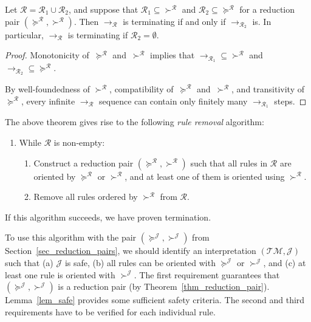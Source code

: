\documentclass[a4paper,UKenglish,cleveref,autoref,numberwithinsect]{lipics-v2019}
\theoremstyle{definition}
\newcommand{\Rules}{\mathcal{R}}
\newcommand{\arr}[1]{\longrightarrow_{#1}}
\newcommand{\Typemap}{\mathcal{T\!M}}
\newcommand{\Termmap}{\mathcal{J}}
\newcommand{\succinterpret}{\succ^{\Termmap}}
\newcommand{\succeqinterpret}{\succeq^{\Termmap}}
\begin{document}
\begin{theorem}\label{thm:ruleremove}
  Let $\Rules = \Rules_1 \cup \Rules_2$, and suppose that
  $\Rules_1\subseteq{\succ^\Rules}$ and
  $\Rules_2\subseteq{\succeq^\Rules}$ for a reduction pair
  $(\succeq^\Rules,\succ^\Rules)$. Then $\arr{\Rules}$ is terminating
  if and only if $\arr{\Rules_2}$ is. In particular, $\arr{\Rules}$ is
  terminating if $\Rules_2 = \emptyset$.
\end{theorem}

\begin{proof}
  Monotonicity of~$\succeq^\Rules$ and~$\succ^\Rules$ implies that
  ${\arr{\Rules_1}}\subseteq{\succ^\Rules}$ and
  ${\arr{\Rules_2}}\subseteq{\succeq^\Rules}$.

  By well-foundedness of $\succ^\Rules$, compatibility
  of~$\succeq^\Rules$ and~$\succ^\Rules$, and transitivity
  of~$\succeq^\Rules$, every infinite $\arr{\Rules}$ sequence can
  contain only finitely many $\arr{\Rules_1}$ steps.
\end{proof}

The above theorem gives rise to the following \emph{rule removal}
algorithm:
\begin{enumerate}
\item While $\Rules$ is non-empty:
  \begin{enumerate}
  \item Construct a reduction pair $(\succeq^\Rules,\succ^\Rules)$
    such that all rules in $\Rules$ are oriented by $\succeq^\Rules$ or
    $\succ^\Rules$, and at least one of them is oriented using
    $\succ^\Rules$.
  \item Remove all rules ordered by $\succ^\Rules$ from $\Rules$.
  \end{enumerate}
\end{enumerate}
If this algorithm succeeds, we have proven termination.

\medskip
To use this algorithm with the pair $(\succeqinterpret,\succinterpret)$
from Section~\ref{sec_reduction_pairs}, we should identify an
interpretation $(\Typemap,\Termmap)$
such that (a) $\Termmap$ is safe, (b) all rules can be oriented with
$\succeqinterpret$ or $\succinterpret$, and (c) at least one rule is
oriented with $\succinterpret$.
%
The first requirement guarantees that
$(\succeqinterpret,\succinterpret)$ is a reduction pair (by
Theorem~\ref{thm_reduction_pair}). Lemma~\ref{lem_safe} provides some
sufficient safety criteria. The second and third
requirements have to be verified for each individual rule.
\end{document}
